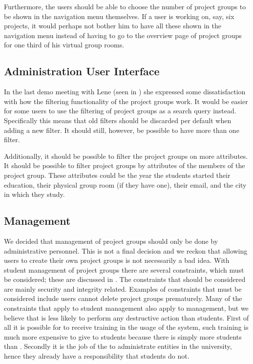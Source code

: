 Furthermore, the users should be able to choose the number of project groups to be shown in the navigation menu themselves.
If a user is working on, say, six projects, it would perhaps not bother him to have all these shown in the navigation menu instead of having to go to the overview page of project groups for one third of his virtual group rooms.

\subsection{Administration User Interface}
In the last demo meeting with Lene (seen in ) she expressed some dissatisfaction with how the filtering functionality of the project groups work.
It would be easier for some users to use the filtering of project groups as a search query instead.
Specifically this means that old filters should be discarded per default when adding a new filter.
It should still, however, be possible to have more than one filter.

Additionally, it should be possible to filter the project groups on more attributes.
It should be possible to filter project groups by attributes of the members of the project group.
These attributes could be the year the students started their education, their physical group room (if they have one), their email, and the city in which they study.


\subsection{Management}
\label{sec:evalAdministration}
We decided that management of project groups should only be done by administrative personnel. 
This is not a final decision and we reckon that allowing users to create their own project groups is not necessarily a bad idea. 
With student management of project groups there are several constraints, which must be considered; these are discussed in . 
The constraints that should be considered are mainly security and integrity related.
Examples of constraints that must be considered include users cannot delete project groups prematurely.
Many of the constraints that apply to student management also apply to \admpers{} management, but we believe that \admpers{} is less likely to perform any destructive action than students.
First of all it is possible for \admpers{} to receive training in the usage of the system, such training is much more expensive to give to students because there is simply more students than \admpers{}.
Secondly it is the job of the \admpers{} to administrate entities in the university, hence they already have a responsibility that students do not.

